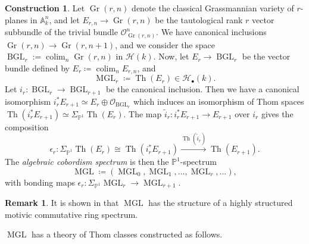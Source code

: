 \documentclass[10pt]{amsart}
\theoremstyle{definition}
\newtheorem{constr}[defn]{Construction}
\newtheorem{rmk}[defn]{Remark}
\theoremstyle{plain}
\numberwithin{equation}{section}
\newcommand{\0}{\emptyset}
\newcommand{\sH}{{\mathcal H}}
\newcommand{\A}{{\mathbb A}}
\renewcommand{\P}{{\mathbb P}}
\newcommand{\MGL}{{\operatorname{MGL}}}
\newcommand{\BGL}{{\operatorname{BGL}}}
\newcommand{\Gr}{{\operatorname{Gr}}}
\newcommand{\Th}{{\operatorname{Th}}}
\newcommand{\colim}{{\operatorname*{colim}}}
\begin{document}
\begin{constr}
    Let $\Gr(r,n)$ denote the classical Grassmannian variety of $r$-planes in $\A_k^n$, and let $E_{r,n} \to \Gr(r,n)$ be the tautological rank $r$ vector subbundle of the trivial bundle $\mathcal{O}^n_{\Gr(r,n)}$. We have canonical inclusions $\Gr(r,n) \to \Gr(r, n+1)$, and we consider the space $\BGL_r:=\colim_n\Gr(r, n)$ in $\sH(k)$. Now, let $E_r \to \BGL_r$ be the vector bundle defined by $E_r \coloneqq \colim_nE_{r,n}$, and
    $$\MGL_r \coloneqq \Th(E_r) \in \sH_{\bullet}(k).$$
    Let $i_r:\BGL_r\to \BGL_{r+1}$ be the canonical inclusion. Then we have a canonical isomorphism $i_r^*E_{r+1}\simeq E_r\oplus \mathcal{O}_{\BGL_r}$ which induces an isomorphism of Thom spaces $\Th(i_r^*E_{r+1})\simeq \Sigma_{\P^1}\Th(E_r)$. The map $\tilde{i}_r:i_r^*E_{r+1}\to E_{r+1}$ over $i_r$ gives the composition
\[
\epsilon_r : \Sigma_{\P^1}\Th(E_r)\cong \Th(i_r^*E_{r+1}) \xrightarrow{\Th(\tilde{i}_r)} \Th(E_{r+1}).
\]
The \emph{algebraic cobordism spectrum} is then the $\P^1$-spectrum
$$\MGL \coloneqq (\MGL_0, \MGL_1, \ldots, \MGL_r, \ldots),$$
with bonding maps $\epsilon_r:\Sigma_{\P^1}\MGL_r\to\MGL_{r+1}$.
\end{constr}

\begin{rmk}
    It is shown in \cite[Section 2.1]{Panin:algcob} that $\MGL$ has the structure of a highly structured motivic commutative ring spectrum.
\end{rmk}

$\MGL$ has a theory of Thom classes constructed as follows.
\end{document}
